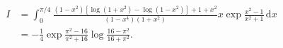 %

\begin{problem}[pytanie 815863]
    \label{stack_815863}%
    \begin{align}
        I & = \int_0^{\pi/4} \frac{ (1-x^2) [ \log(1+x^2) - \log(1 - x^2)] + 1 + x^2}{(1-x^4)(1+x^2)} x \exp \frac {x^2 - 1}{x^2 + 1} \,\mathrm{d} x \\
        & =  - \frac 1 4  \exp \frac{\pi^2 - 16}{\pi^2 + 16} \log \frac {16 - \pi^2}{16 + \pi^2}.
    \end{align}
\end{problem}

%